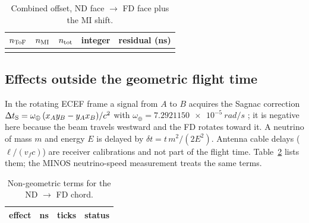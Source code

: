 \documentclass[11pt,letterpaper]{article}
\newcommand{\ND}{ND}
\newcommand{\FD}{FD}
\begin{document}
\begin{table}[htbp]\centering\small
\caption{Combined offset, \ND{} face $\to$ \FD{} face plus the MI shift.}
\label{tab:total}
\begin{tabular}{rrrrr}
\toprule
$n_{\rm ToF}$ & $n_{\rm MI}$ & $n_{\rm tot}$ & integer & residual (ns) \\
\midrule
 \\
\bottomrule
\end{tabular}
\end{table}
\begin{table}[htbp]\centering\small
\caption{Trigger window $[t-\SI{20}{\micro s},\,t+\SI{30}{\micro s})$ in ticks after $t_0$, relative to the flight time alone and to the flight time plus the MI shift.}
\label{tab:window}
\end{table}

\subsection{Effects outside the geometric flight time}
\label{sec:effects}
In the rotating ECEF frame a signal from $A$ to $B$ acquires the Sagnac correction $\Delta t_{\rm S}=\omega_\oplus\,(x_Ay_B-y_Ax_B)/c^2$ with $\omega_\oplus=\SI{7.2921150e-5}{rad/s}$ \cite{iers2010}; it is negative here because the beam travels westward and the \FD{} rotates toward it.  A neutrino of mass $m$ and energy $E$ is delayed by $\delta t=t\,m^2/(2E^2)$.  Antenna cable delays ($\ell/(v_f c)$) are receiver calibrations and not part of the flight time.  Table~\ref{tab:effects} lists them; the MINOS neutrino-speed measurement \cite{minostof2015} treats the same terms.

\begin{table}[htbp]\centering\small
\caption{Non-geometric terms for the \ND{} $\to$ \FD{} chord.}
\label{tab:effects}
\begin{tabular}{p{7.4cm}rrp{3.6cm}}
\toprule
effect & ns & ticks & status \\
\midrule

\end{tabular}
\end{table}
\end{document}
